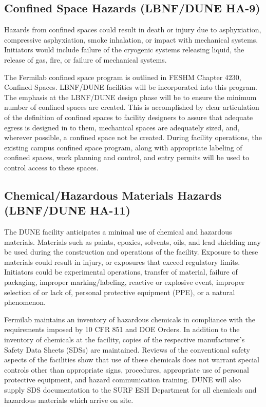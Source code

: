 \subsection{Confined Space Hazards (LBNF/DUNE HA-9)}

Hazards from confined spaces could result in death or injury due to
asphyxiation, compressive asphyxiation, smoke inhalation, or impact
with mechanical systems. Initiators would include failure of the
cryogenic systems releasing liquid, the release of gas, fire, or
failure of mechanical systems.

The Fermilab confined space program is outlined in FESHM Chapter 4230,
Confined Spaces. LBNF/DUNE facilities will be incorporated into this
program. The emphasis at the LBNF/DUNE design phase will be to ensure
the minimum number of confined spaces are created. This is
accomplished by clear articulation of the definition of confined
spaces to facility designers to assure that adequate egress is
designed in to them, mechanical spaces are adequately sized, and,
wherever possible, a confined space not be created. During facility
operations, the existing campus confined space program, along with
appropriate labeling of confined spaces, work planning and control,
and entry permits will be used to control access to these spaces.


\subsection{Chemical/Hazardous Materials Hazards (LBNF/DUNE HA-11)}

The DUNE facility anticipates a minimal use of chemical and hazardous
materials. Materials such as paints, epoxies, solvents, oils, and lead
shielding may be used during the construction and operations of the
facility. Exposure to these materials could result in injury, or
exposures that exceed regulatory limits. Initiators could be
experimental operations, transfer of material, failure of packaging,
improper marking/labeling, reactive or explosive event, improper
selection of or lack of, personal protective equipment (PPE), or a
natural phenomenon.

Fermilab maintains an inventory of hazardous chemicals in compliance
with the requirements imposed by 10 CFR 851 and DOE Orders. In
addition to the inventory of chemicals at the facility, copies of the
respective manufacturer's Safety Data Sheets (SDSs) are
maintained. Reviews of the conventional safety aspects of the
facilities show that use of these chemicals does not warrant special
controls other than appropriate signs, procedures, appropriate use of
personal protective equipment, and hazard communication training. DUNE
will also supply SDS documentation to the SURF ESH Department for all
chemicals and hazardous materials which arrive on site.

